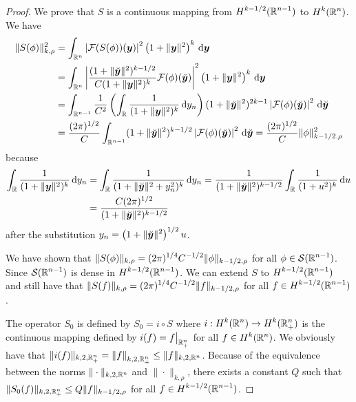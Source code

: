 \begin{proof}
We prove that $S$ is a continuous mapping from
$\displaystyle H^{k-1/2}(\mathbb{R}^{n-1})$ to $\displaystyle H^k(\mathbb{R}^n)$.
We have
\begin{align*}
\|S(\phi)\|_{k,\rho}^2
&= \int_{\mathbb{R}^n} \left| \mathcal{F}(S(\phi))({\bm{y}}) \right|^2
\left( 1 + \|{\bm{y}}\|^2\right)^k \,\mathrm{d}{{\bm{y}}} \\
&= \int_{\mathbb{R}^n} \left|
\frac{(1+\|\breve{{\bm{y}}}\|^2)^{k-1/2}}{C (1+ \|{\bm{y}}\|^2)^k}
\mathcal{F}(\phi)(\breve{{\bm{y}}}) \right|^2
\left( 1 + \|{\bm{y}}\|^2\right)^k \,\mathrm{d}{{\bm{y}}} \\
&= \int_{\mathbb{R}^{n-1}} \frac{1}{C^2} \left( \int_{\mathbb{R}}
\frac{1}{(1+ \|{\bm{y}}\|^2)^k} \,\mathrm{d}{y_n} \right)
(1+\|\breve{{\bm{y}}}\|^2)^{2k-1} \left| \mathcal{F}(\phi)(\breve{{\bm{y}}}) \right|^2
\,\mathrm{d}{\breve{{\bm{y}}}} \\
&= \frac{(2\pi)^{1/2}}{C} \int_{\mathbb{R}^{n-1}}
(1+\|\breve{{\bm{y}}}\|^2)^{k-1/2} \left| \mathcal{F}(\phi)(\breve{{\bm{y}}}) \right|^2
\,\mathrm{d}{\breve{{\bm{y}}}} = \frac{(2\pi)^{1/2}}{C} \|\phi\|_{k-1/2.\rho}^2
\end{align*}
because
\begin{align}
\int_{\mathbb{R}} \frac{1}{(1 + \|{\bm{y}}\|^2)^k} \,\mathrm{d}{y_n}
&= \int_{\mathbb{R}} \frac{1}{(1 + \|\breve{{\bm{y}}}\|^2 + y_n^2)^k} \,\mathrm{d}{y_n}
= \frac{1}{(1 + \|\breve{{\bm{y}}}\|^2)^{k-1/2}}
\int_{\mathbb{R}} \frac{1}{(1 + u^2)^k} \,\mathrm{d}{u} \nonumber \\
&= \frac{C (2\pi)^{1/2}}{(1 + \|\breve{{\bm{y}}}\|^2)^{k-1/2}}
\label{TraceT0Eq1}
\end{align}
after the substitution
$\displaystyle y_n = \left(1 + \|\breve{{\bm{y}}}\|^2\right)^{1/2} u$.

We have shown that
$\displaystyle \|S(\phi)\|_{k,\rho}
= (2\pi)^{1/4} C^{-1/2} \|\phi\|_{k-1/2,\rho}$
for all $\displaystyle \phi \in \mathcal{S}(\mathbb{R}^{n-1})$.
Since $\displaystyle \mathcal{S}(\mathbb{R}^{n-1})$ is dense in
$\displaystyle H^{k-1/2}(\mathbb{R}^{n-1})$.  We can
extend $S$ to $\displaystyle H^{k-1/2}(\mathbb{R}^{n-1})$ and still
have that
$\displaystyle \|S(f)\|_{k,\rho} = (2\pi)^{1/4} C^{-1/2} \|f\|_{k-1/2,\rho}$
for all $\displaystyle f \in H^{k-1/2}(\mathbb{R}^{n-1})$.

The operator $S_0$ is defined by $S_0 = i \circ S$ where
$\displaystyle i: H^{k}(\mathbb{R}^n) \to H^{k}(\mathbb{R}^n_+)$ is the
continuous mapping defined by $\displaystyle i(f) = f\big|_{\mathbb{R}^n_+}$ for all
$\displaystyle f \in H^{k}(\mathbb{R}^n)$.  We obviously have that
$\displaystyle \|i(f)\|_{k,2,\mathbb{R}^n_+} = \left\|f\right\|_{k,2,\mathbb{R}^n_+}
\leq \|f \|_{k,2,\mathbb{R}^n}$.  Because of the equivalence between the
norms $\|\cdot\|_{k,2,\mathbb{R}^n}$ and $\|\cdot\|_{k,\rho}$, there exists a
constant $Q$ such that
$\displaystyle \|S_0(f)\|_{k,2,\mathbb{R}^n_+} \leq Q \|f\|_{k-1/2,\rho}$ for all
$\displaystyle f \in H^{k-1/2}(\mathbb{R}^{n-1})$.


\end{proof}
